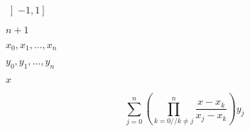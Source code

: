 \documentclass{article}
\begin{document}
$\left ]-1,1\right]$
\pagebreak

$n + 1$
\pagebreak

$x_0, x_1, \ldots, x_n$
\pagebreak

$y_0, y_1, \ldots, y_n$
\pagebreak

$x$
\pagebreak

\[ \sum_{j = 0}^n \left (\prod_{k = 0//k \neq j}^{n} \frac{x-x_k}{x_j - x_k} \right ) y_j \]
\pagebreak
\end{document}
